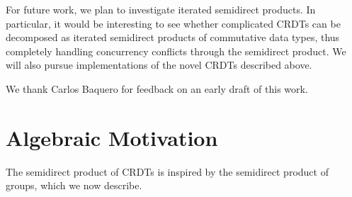 \documentclass[acmsmall,nonacm,12pt]{acmart}
\theoremstyle{plain}
\theoremstyle{definition}
\begin{document}
For future work, we plan to investigate iterated semidirect products.  In particular, it would be interesting to see whether complicated CRDTs can be decomposed as iterated semidirect products of commutative data types, thus completely handling concurrency conflicts through the semidirect product.  We will also pursue implementations of the novel CRDTs described above.


\begin{acks}
We thank Carlos Baquero for feedback on an early draft of this work.
\end{acks}






\appendix

\section{Algebraic Motivation}
\label{sec:algebra}
The semidirect product of CRDTs is inspired by the semidirect product of groups, which we now describe.
\end{document}
